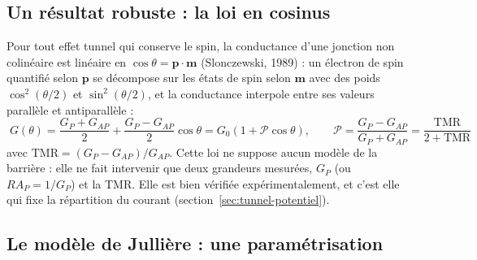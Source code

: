 \documentclass[11pt,a4paper]{article}
\newcommand{\vm}{\bm{m}}
\newcommand{\vp}{\bm{p}}
\begin{document}
\subsection{Un résultat robuste : la loi en cosinus}

Pour tout effet tunnel qui conserve le spin, la conductance d'une jonction
non colinéaire est linéaire en $\cos\theta = \vp\cdot\vm$ (Slonczewski,
1989) : un électron de spin quantifié selon $\vp$ se décompose sur les
états de spin selon $\vm$ avec des poids $\cos^2(\theta/2)$ et
$\sin^2(\theta/2)$, et la conductance interpole entre ses valeurs
parallèle et antiparallèle :
\begin{equation}
  \boxed{\;G(\theta) = \frac{G_P+G_{AP}}{2} + \frac{G_P-G_{AP}}{2}\cos\theta
  = G_0\left(1+\mathcal{P}\cos\theta\right),
  \qquad
  \mathcal{P} = \frac{G_P-G_{AP}}{G_P+G_{AP}} = \frac{\mathrm{TMR}}{2+\mathrm{TMR}}\;}
  \label{eq:cosinus}
\end{equation}
avec $\mathrm{TMR} = (G_P-G_{AP})/G_{AP}$. Cette loi ne suppose aucun
modèle de la barrière : elle ne fait intervenir que deux grandeurs
mesurées, $G_P$ (ou $RA_P = 1/G_P$) et la TMR. Elle est bien vérifiée
expérimentalement, et c'est elle qui fixe la répartition du courant
(section~\ref{sec:tunnel-potentiel}).

\subsection{Le modèle de Jullière : une paramétrisation}
\end{document}
